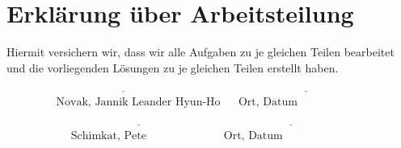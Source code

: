 \documentclass[twoside,10pt,fleqn,headinclude=false]{scrartcl}
\begin{document}
\section*{Erklärung über Arbeitsteilung}

Hiermit versichern wir, dass wir alle Aufgaben zu je gleichen Teilen bearbeitet und die vorliegenden Lösungen zu je gleichen Teilen erstellt haben.

\begin{align*}
	& \underline{\hspace{5cm}} && \underline{\hspace{5cm}}\\
	& \text{Novak, Jannik Leander Hyun-Ho} && \text{Ort, Datum}
\end{align*}

\begin{align*}
	& \underline{\hspace{5cm}} && \underline{\hspace{5cm}}\\
	& \text{Schimkat, Pete} && \text{Ort, Datum}
\end{align*}

\newpage
\end{document}
